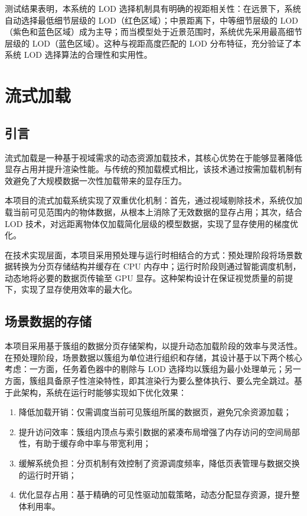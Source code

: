 测试结果表明，本系统的 LOD 选择机制具有明确的视距相关性：在远景下，系统自动选择最低细节层级的 LOD（红色区域）；中景距离下，中等细节层级的 LOD（紫色和蓝色区域）成为主导；而当模型处于近景范围时，系统优先采用最高细节层级的 LOD（蓝色区域）。这种与视距高度匹配的 LOD 分布特征，充分验证了本系统 LOD 选择算法的合理性和实用性。

\section{流式加载} \label{sec:streaming}

\subsection{引言}

流式加载是一种基于视域需求的动态资源加载技术，其核心优势在于能够显著降低显存占用并提升渲染性能。与传统的预加载模式相比，该技术通过按需加载机制有效避免了大规模数据一次性加载带来的显存压力\cite{sahm2004}。

本项目的流式加载系统实现了双重优化机制：首先，通过视域剔除技术，系统仅加载当前可见范围内的物体数据，从根本上消除了无效数据的显存占用\cite{CohenOr2003}；其次，结合 LOD 技术，对远距离物体仅加载简化层级的模型数据，实现了显存使用的梯度优化。

在技术实现层面，本项目采用预处理与运行时相结合的方式：预处理阶段将场景数据转换为分页存储结构并缓存在 CPU 内存中；运行时阶段则通过智能调度机制，动态地将必要的数据页传输至 GPU 显存。这种架构设计在保证视觉质量的前提下，实现了显存使用效率的最大化。

\subsection{场景数据的存储}

本项目采用基于簇组的数据分页存储架构，以提升动态加载阶段的效率与灵活性。在预处理阶段，场景数据以簇组为单位进行组织和存储，其设计基于以下两个核心考虑：一方面，任务着色器中的剔除与 LOD 选择均以簇组为最小处理单元；另一方面，簇组具备原子性渲染特性，即其渲染行为要么整体执行、要么完全跳过。基于此架构，系统在运行时能够实现如下优化效果：

\begin{enumerate}
    \item 降低加载开销：仅需调度当前可见簇组所属的数据页，避免冗余资源加载；
    \item 提升访问效率：簇组内顶点与索引数据的紧凑布局增强了内存访问的空间局部性\cite{MCCOOL2012}，有助于缓存命中率与带宽利用；
    \item 缓解系统负担：分页机制有效控制了资源调度频率，降低页表管理与数据交换的运行时开销；
    \item 优化显存占用：基于精确的可见性驱动加载策略，动态分配显存资源，提升整体利用率。
\end{enumerate}

